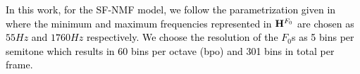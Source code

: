 \documentclass{article}
\newcommand{\gpcor}[2]{{\textcolor{black}{#2}}}
\newcommand{\db}[1]{{\textcolor{black}{#1}}}
\newcommand{\jb}[1]{{\textcolor{black}{#1}}}
\begin{document}





\db{In this work, for the SF-NMF model, we follow the parametrization given in \cite{bittner2016_comparison} where the minimum and maximum frequencies represented in $\mathbf{H}^{F_{0}}$ are chosen as $55 Hz$ and $1760 Hz$ respectively. We choose the resolution of the $F_0$s as 5 bins per semitone which results in 60 bins per octave (bpo) and 301 bins in total per frame.}
\end{document}
